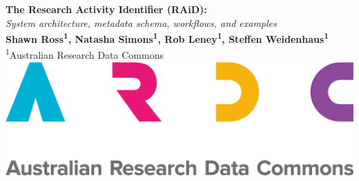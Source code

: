 \documentclass[a0,portrait]{a0poster}
\begin{document}
\setlength{\columnsep}{2cm}

\begin{multicols}{2}

\noindent
\vspace{0pt}
\Huge \color{ARDCBlue} \textbf{The Research Activity Identifier (RAiD):} \color{Black}\\[0.3cm]
\LARGE\textit{System architecture, metadata schema, workflows, and examples}\\[1cm]
\Large \textbf{Shawn Ross\textsuperscript{1}, Natasha Simons\textsuperscript{1}, Rob Leney\textsuperscript{1}, Steffen Weidenhaus\textsuperscript{1}}\\[0.5cm]
\large \textsuperscript{1}Australian Research Data Commons
\vfill\null
\columnbreak
\raggedleft
\noindent\includegraphics[width=0.5\linewidth]{ARDC logo - RGB.png}
\end{multicols}     
\end{document}

